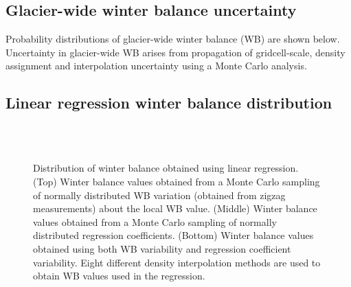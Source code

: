 \documentclass{sfuthesis}
\begin{document}
{\begin{appendices}

\chapter{Glacier-wide winter balance uncertainty}

Probability distributions of glacier-wide winter balance (WB) are shown below. Uncertainty in glacier-wide WB arises from propagation of gridcell-scale, density assignment and interpolation uncertainty using a Monte Carlo analysis.

\pagebreak
\section{Linear regression winter balance distribution}

\begin{figure}[b!]
	\centering
	\\%
	\\%
	\caption[]{Distribution of winter balance obtained using linear regression. (Top) Winter balance values obtained from a Monte Carlo sampling of normally distributed WB variation (obtained from zigzag measurements) about the local WB value. (Middle) Winter balance  values obtained from a Monte Carlo sampling of normally distributed regression coefficients. (Bottom) Winter balance  values obtained using both WB variability and regression coefficient variability. Eight different density interpolation methods are used to obtain WB values used in the regression.}
	\label{fig:WSMB_LR_allDensity}
\end{figure}



\end{appendices}}
\end{document}
